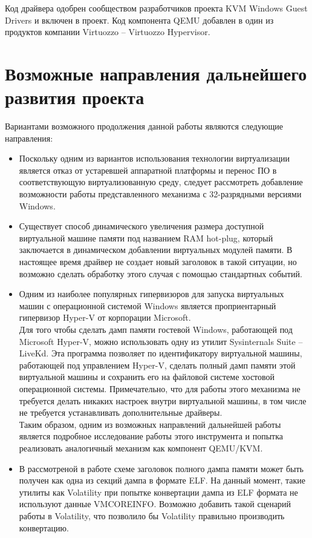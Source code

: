 \documentclass{mipt-thesis-bs}
\begin{document}
Код драйвера одобрен сообществом разработчиков проекта KVM Windows Guest Drivers и включен в проект. Код компонента QEMU добавлен в один из продуктов компании Virtuozzo -- Virtuozzo Hypervisor.

\chapter{Возможные направления дальнейшего развития проекта}

Вариантами возможного продолжения данной работы являются следующие направления:
\begin{itemize}
\item Поскольку одним из вариантов использования технологии виртуализации является отказ от устаревшей аппаратной платформы и перенос ПО в соответствующую виртуализованную среду, следует рассмотреть добавление возможности работы представленного механизма с 32-разрядными версиями Windows.
\item Существует способ динамического увеличения размера доступной виртуальной машине памяти под названием RAM hot-plug, который заключается в динамическом добавлении виртуальных модулей памяти. В настоящее время драйвер не создает новый заголовок в такой ситуации, но возможно сделать обработку этого случая с помощью стандартных событий.
\item Одним из наиболее популярных гипервизоров для запуска виртуальных машин с операционной системой Windows является проприентарный гипервизор Hyper-V от корпорации Microsoft.\\Для того чтобы сделать дамп памяти гостевой Windows, работающей под Microsoft Hyper-V, можно использовать одну из утилит Sysinternals Suite -- LiveKd\cite{livekd-hv}. Эта программа позволяет по идентификатору виртуальной машины, работающей под управлением Hyper-V, сделать полный дамп памяти этой виртуальной машины и сохранить его на файловой системе хостовой операционной системы. Примечательно, что для работы этого механизма не требуется делать никаких настроек внутри виртуальной машины, в том числе не требуется устанавливать дополнительные драйверы.\\Таким образом, одним из возможных направлений дальнейшей работы является подробное исследование работы этого инструмента и попытка реализовать аналогичный механизм как компонент QEMU/KVM.
\newpage
\item В рассмотреной в работе схеме заголовок полного дампа памяти может быть получен как одна из секций дампа в формате ELF. На данный момент, такие утилиты как Volatility при попытке конвертации дампа из ELF формата не используют данные VMCOREINFO. Возможно добавить такой сценарий работы в Volatility, что позволило бы Volatility правильно производить конвертацию.
\end{itemize}

\printbibliography
\end{document}

